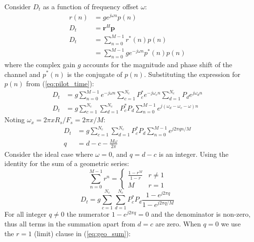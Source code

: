 \documentclass{article}
\begin{document}
Consider $D_t$ as a function of frequency offset $\omega$:
\begin{equation}
\label{eq:dt_freq}
\begin{split}
r(n) &= ge^{j \omega n}p(n) \\
D_t  &= \bm{r}^H\bm{p} \\
D_t  &= \sum_{n=0}^{M-1}r^*(n)p(n) \\
     &= \sum_{n=0}^{M-1}ge^{-j \omega n}p^*(n)p(n) 
\end{split}
\end{equation}
where the complex gain $g$ accounts for the magnitude and phase shift of the channel and $p^*(n)$ is the conjugate of $p(n)$.  Substituting the expression for $p(n)$ from (\ref{eq:pilot_time}):
\begin{equation}
\begin{split}
D_t &= g\sum_{n=0}^{M-1}e^{-j \omega n} \sum_{c=1}^{N_c}P^*_c e^{-j \omega_c n} \sum_{d=1}^{N_c}P_d e^{j \omega_d n} \\
D_t &= g \sum_{c=1}^{N_c} \sum_{d=1}^{N_c}P^*_c P_d\sum_{n=0}^{M-1}e^{j (\omega_d - \omega_c - \omega) n}
\end{split}
\end{equation}
Noting $\omega_x = 2 \pi x R_s/F_s = 2 \pi x/M$:
\begin{equation}
\begin{split}
D_t &= g \sum_{c=1}^{N_c} \sum_{d=1}^{N_c}P^*_c P_d\sum_{n=0}^{M-1}e^{j 2 \pi q n/M} \\
  q &= d - c - \frac{M \omega}{ 2 \pi}
\end{split}
\end{equation}
Consider the ideal case where $\omega=0$, and $q = d-c$ is an integer. Using the identity for the sum of a geometric series:
\begin{equation}
\label{eq:geo_sum}
\sum_{n=0}^{M-1} r^n = 
\begin{cases}
  \frac{1-r^M}{1-r} & r \ne 1 \\
   M                & r = 1 
\end{cases}   
\end{equation}
\begin{equation}
\label{eq:dt_closed}
D_t = g \sum_{c=1}^{N_c} \sum_{d=1}^{N_c}P^*_c P_d \frac{1 - e^{j 2 \pi q }}{ 1 - e^{j 2 \pi q/M}}
\end{equation}
For all integer $q \ne 0$ the numerator $1 - e^{j 2 \pi q} = 0$ and the denominator is non-zero, thus all terms in the summation apart from $d=c$ are zero. When $q = 0$ we use the  $r=1$ (limit) clause in (\ref{eq:geo_sum}):
\end{document}
